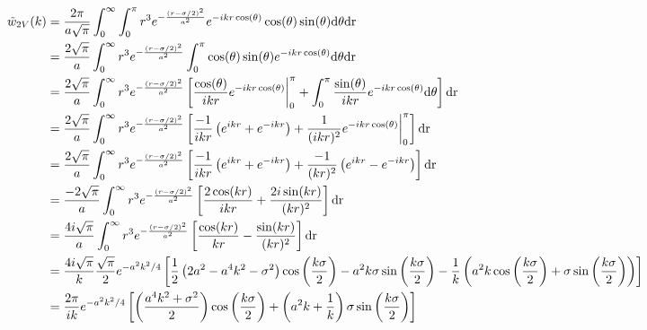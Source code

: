 \documentclass[letterpaper,twocolumn,amsmath,amssymb,prb]{revtex4-1}
\begin{document}
\begin{widetext}
\begin{align}
  \tilde{w}_{2V}(k) &= \frac{2 \pi}{a\sqrt{\pi}}\int_0^\infty \int_0^\pi r^3
  e^{-\frac{(r-\sigma/2)^2}{a^2}} e^{-ikr \cos(\theta)} \cos(\theta)
  \sin(\theta) \mathrm{d \theta dr} \\
  &= \frac{2 \sqrt{\pi}}{a}\int_0^\infty r^3
  e^{-\frac{(r-\sigma/2)^2}{a^2}} \int_0^\pi \cos(\theta)
  \sin(\theta)e^{-ikr \cos(\theta)}\mathrm{d \theta dr} \\
  &= \frac{2 \sqrt{\pi}}{a}\int_0^\infty r^3
  e^{-\frac{(r-\sigma/2)^2}{a^2}} \left[ \frac{\cos(\theta)}{ikr}
    e^{-ikr\cos(\theta)} \bigg{|}_0^\pi + \int_0^\pi
    \frac{\sin(\theta)}{ikr}e^{-ikr\cos(\theta)} \mathrm{d \theta}
    \right] \mathrm{dr} \\
  &= \frac{2 \sqrt{\pi}}{a}\int_0^\infty r^3
  e^{-\frac{(r-\sigma/2)^2}{a^2}} \left[ \frac{-1}{ikr}\left(
    e^{ikr} + e^{-ikr} \right) +
    \frac{1}{(ikr)^2}e^{-ikr\cos(\theta)} \bigg{|}_0^\pi \right]
  \mathrm{dr} \\
  &= \frac{2 \sqrt{\pi}}{a}\int_0^\infty r^3
  e^{-\frac{(r-\sigma/2)^2}{a^2}} \left[ \frac{-1}{ikr}\left(
    e^{ikr} + e^{-ikr} \right)
    +\frac{-1}{(kr)^2} \left(e^{ikr} -
    e^{-ikr}\right)\right] \mathrm{dr} \\
  &= \frac{-2 \sqrt{\pi}}{a}\int_0^\infty r^3
  e^{-\frac{(r-\sigma/2)^2}{a^2}} \left[ \frac{2\cos(kr)}{ikr}
    +\frac{2i\sin(kr)}{(kr)^2}\right] \mathrm{dr} \\
  &= \frac{4i \sqrt{\pi}}{a}\int_0^\infty r^3
  e^{-\frac{(r-\sigma/2)^2}{a^2}} \left[ \frac{\cos(kr)}{kr}
    -\frac{\sin(kr)}{(kr)^2}\right] \mathrm{dr} \\
  &= \frac{4i \sqrt{\pi}}{k} \frac{\sqrt{\pi}} {2}e^{-a^2k^2/4}\left[
    \frac{1}{2} \left(2a^2-a^4k^2-\sigma^2 \right)
    \cos\left(\frac{k\sigma}{2}\right) - a^2k\sigma \sin\left(\frac{k\sigma}{2}\right) -
    \frac{1}{k}\left( a^2k\cos\left(\frac{k\sigma}{2}\right) + \sigma
    \sin\left(\frac{k\sigma}{2}\right) \right) \right] \\
  &= \frac{2 \pi}{ik}e^{-a^2k^2/4}\left[ \left(\frac{a^4k^2 +
      \sigma^2}{2} \right) \cos\left(\frac{k\sigma}{2}\right) +
    \left(a^2k + \frac{1}{k} \right)\sigma \sin\left(\frac{k\sigma}{2}\right) \right]
\end{align}


\end{widetext}
\end{document}
